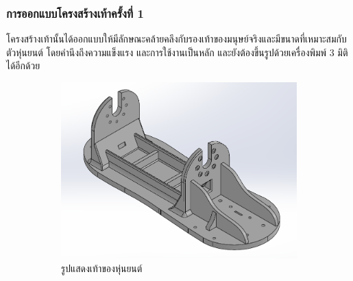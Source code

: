 \subsubsection{การออกแบบโครงสร้างเท้าครั้งที่ 1}
โครงสร้างเท้านั้นได้ออกแบบให้มีลักษณะคล้ายคลึงกับรองเท้าของมนุษย์จริงและมีขนาดที่เหมาะสมกับตัวหุ่นยนต์ โดยคำนึงถึงความแข็งแรง
และการใช้งานเป็นหลัก และยังต้องขึ้นรูปด้วยเครื่องพิมพ์ 3 มิติได้อีกด้วย
\begin{figure}[!ht]
  \centering
  \begin{subfigure}[b]{0.55\linewidth}
    \includegraphics[width=\linewidth]{chapter4/images/foot_old.PNG}
    \caption{รูปแสดงเท้าของหุ่นยนต์}
  \end{subfigure}
  \begin{subfigure}[b]{0.2\linewidth}

\end{subfigure}
\end{figure}
